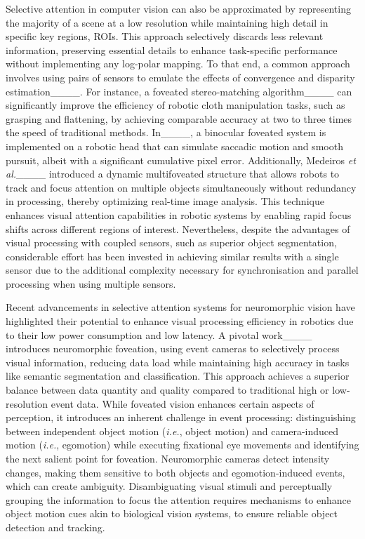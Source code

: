 Selective attention in computer vision can also be approximated by representing the majority of a scene at a low resolution while maintaining high detail in specific key regions, ROIs. This approach selectively discards less relevant information, preserving essential details to enhance task-specific performance without implementing any log-polar mapping.
To that end, a common approach involves using pairs of sensors to emulate the effects of convergence and disparity estimation____. For instance, a foveated stereo-matching algorithm____ can significantly improve the efficiency of robotic cloth manipulation tasks, such as grasping and flattening, by achieving comparable accuracy at two to three times the speed of traditional methods. In____, a binocular foveated system is implemented on a robotic head that can simulate saccadic motion and smooth pursuit, albeit with a significant cumulative pixel error. Additionally, Medeiros \emph{et al.}____ introduced a dynamic multifoveated structure that allows robots to track and focus attention on multiple objects simultaneously without redundancy in processing, thereby optimizing real-time image analysis. This technique enhances visual attention capabilities in robotic systems by enabling rapid focus shifts across different regions of interest. Nevertheless, despite the advantages of visual processing with coupled sensors, such as superior object segmentation, considerable effort has been invested in achieving similar results with a single sensor due to the additional complexity necessary for synchronisation and parallel processing when using multiple sensors.

Recent advancements in selective attention systems for neuromorphic vision have highlighted their potential to enhance visual processing efficiency in robotics due to their low power consumption and low latency. 
A pivotal work____ introduces neuromorphic foveation, using event cameras to selectively process visual information, reducing data load while maintaining high accuracy in tasks like semantic segmentation and classification. This approach achieves a superior balance between data quantity and quality compared to traditional high or low-resolution event data.
While foveated vision enhances certain aspects of perception, it introduces an inherent challenge in event processing: distinguishing between independent object motion (\emph{i.e.}, object motion) and camera-induced motion (\emph{i.e.}, egomotion) while executing fixational eye movements and identifying the next salient point for foveation.
Neuromorphic cameras detect intensity changes, making them sensitive to both objects and egomotion-induced events, which can create ambiguity. Disambiguating visual stimuli and perceptually grouping the information to focus the attention requires mechanisms to enhance object motion cues akin to biological vision systems, to ensure reliable object detection and tracking.

